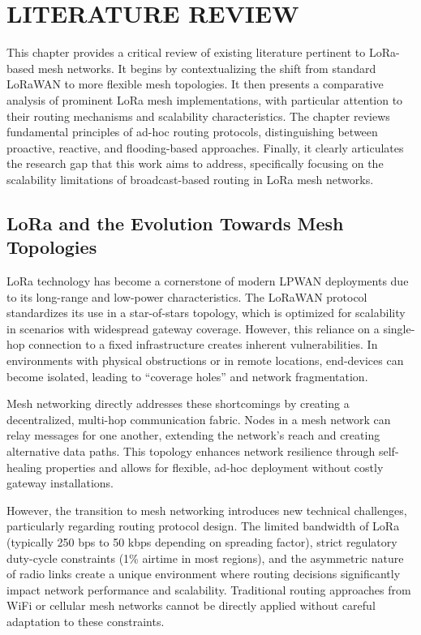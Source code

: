 \setlength{\parindent}{0in}
\setlength{\parskip}{0mm}
\setlength{\baselineskip}{1.6em}

\chapter{LITERATURE REVIEW}
\label{chap:literature}

This chapter provides a critical review of existing literature pertinent to LoRa-based mesh networks. It begins by contextualizing the shift from standard LoRaWAN to more flexible mesh topologies. It then presents a comparative analysis of prominent LoRa mesh implementations, with particular attention to their routing mechanisms and scalability characteristics. The chapter reviews fundamental principles of ad-hoc routing protocols, distinguishing between proactive, reactive, and flooding-based approaches. Finally, it clearly articulates the research gap that this work aims to address, specifically focusing on the scalability limitations of broadcast-based routing in LoRa mesh networks.

\section{LoRa and the Evolution Towards Mesh Topologies}

LoRa technology has become a cornerstone of modern LPWAN deployments due to its long-range and low-power characteristics. The LoRaWAN protocol standardizes its use in a star-of-stars topology, which is optimized for scalability in scenarios with widespread gateway coverage. However, this reliance on a single-hop connection to a fixed infrastructure creates inherent vulnerabilities. In environments with physical obstructions or in remote locations, end-devices can become isolated, leading to ``coverage holes'' and network fragmentation.

Mesh networking directly addresses these shortcomings by creating a decentralized, multi-hop communication fabric. Nodes in a mesh network can relay messages for one another, extending the network's reach and creating alternative data paths. This topology enhances network resilience through self-healing properties and allows for flexible, ad-hoc deployment without costly gateway installations.

However, the transition to mesh networking introduces new technical challenges, particularly regarding routing protocol design. The limited bandwidth of LoRa (typically 250 bps to 50 kbps depending on spreading factor), strict regulatory duty-cycle constraints (1\% airtime in most regions), and the asymmetric nature of radio links create a unique environment where routing decisions significantly impact network performance and scalability. Traditional routing approaches from WiFi or cellular mesh networks cannot be directly applied without careful adaptation to these constraints.


